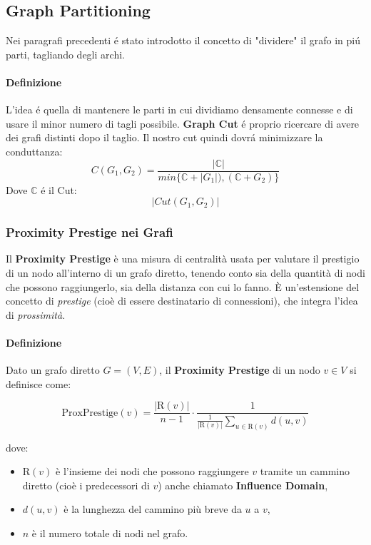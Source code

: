 \subsection{Graph Partitioning}
Nei paragrafi precedenti é stato introdotto il concetto di "dividere" il grafo in piú parti, tagliando degli archi. 
\paragraph{Definizione} L'idea é quella di mantenere le parti in cui dividiamo densamente connesse e di usare il minor numero di tagli possibile. \textbf{Graph Cut} é proprio ricercare di avere dei grafi distinti dopo il taglio. Il nostro cut quindi dovrá minimizzare la conduttanza: 
\[
C(G_1, G_2) = \frac{|\mathbb{C}|}{min\{\mathbb{C} + |G_1|), (\mathbb{C} + G_2)\}}
\]
Dove $\mathbb{C}$ é il Cut:
\[
|Cut(G_1, G_2)|
\]

\subsubsection*{Proximity Prestige nei Grafi}

Il \textbf{Proximity Prestige} è una misura di centralità usata per valutare il prestigio di un nodo all'interno di un grafo diretto, tenendo conto sia della quantità di nodi che possono raggiungerlo, sia della distanza con cui lo fanno. È un'estensione del concetto di \textit{prestige} (cioè di essere destinatario di connessioni), che integra l’idea di \textit{prossimità}.

\paragraph{Definizione}

Dato un grafo diretto \( G = (V, E) \), il \textbf{Proximity Prestige} di un nodo \( v \in V \) si definisce come:

\[
\text{ProxPrestige}(v) = \frac{|\text{R}(v)|}{n-1} \cdot \frac{1}{\frac{1}{|\text{R}(v)|} \sum_{u \in \text{R}(v)} d(u, v)}
\]

dove:
\begin{itemize}
    \item \( \text{R}(v) \) è l'insieme dei nodi che possono raggiungere \( v \) tramite un cammino diretto (cioè i predecessori di \( v \)) anche chiamato \textbf{Influence Domain}, 
    \item \( d(u, v) \) è la lunghezza del cammino più breve da \( u \) a \( v \),
    \item \( n \) è il numero totale di nodi nel grafo.
\end{itemize}

